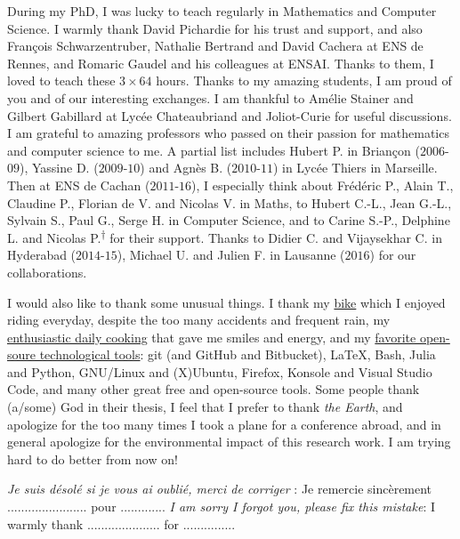 \begin{acknowledgements}
During my PhD, I was lucky to teach regularly in Mathematics and Computer Science.
I warmly thank David Pichardie for his trust and support, and also François Schwarzentruber, Nathalie Bertrand and David Cachera at ENS de Rennes, and Romaric Gaudel and his colleagues at ENSAI. Thanks to them, I loved to teach these $3 \times 64$ hours.
Thanks to my amazing students, I am proud of you and of our interesting exchanges.
I am thankful to Amélie Stainer and Gilbert Gabillard at Lycée Chateaubriand and Joliot-Curie for useful discussions.
\\
\indent
I am grateful to amazing professors who passed on their passion for mathematics and computer science to me.
A partial list includes Hubert P. in Briançon ($2006$-$09$), Yassine D. ($2009$-$10$) and Agnès B. ($2010$-$11$) in Lycée Thiers in Marseille.
Then at ENS de Cachan ($2011$-$16$), I especially think about Frédéric P., Alain T., Claudine P., Florian de V. and Nicolas V. in Maths, to Hubert C.-L., Jean G.-L., Sylvain S., Paul G., Serge H. in Computer Science, and to Carine S.-P., Delphine L. and Nicolas P.\textsuperscript{$\dagger$} for their support.
Thanks to Didier C. and Vijaysekhar C. in Hyderabad ($2014$-$15$), Michael U. and Julien F. in Lausanne ($2016$) for our collaborations.


I would also like to thank some unusual things.
I thank my \href{https://perso.crans.org/besson/zero-dechet/}{bike} which I enjoyed riding everyday, despite the too many accidents and frequent rain, my \href{https://perso.crans.org/besson/cuisine/}{enthusiastic daily cooking} that gave me smiles and energy, and my \href{https://perso.crans.org/besson/}{favorite open-soure technological tools}: git (and GitHub and Bitbucket), \LaTeX, Bash, Julia and Python, GNU/Linux and (X)Ubuntu, Firefox, Konsole and Visual Studio Code, and many other great free and open-source tools.
Some people thank (a/some) God in their thesis, I feel that I prefer to thank \emph{the Earth}, and apologize for the too many times I took a plane for a conference abroad, and in general apologize for the environmental impact of this research work. I am trying hard to do better from now on!


\vfill{}

\emph{Je suis désolé si je vous ai oublié, merci de corriger} : Je remercie sincèrement ....................... pour .............
\emph{I am sorry I forgot you, please fix this mistake}: I warmly thank ..................... for ...............


\end{acknowledgements}
